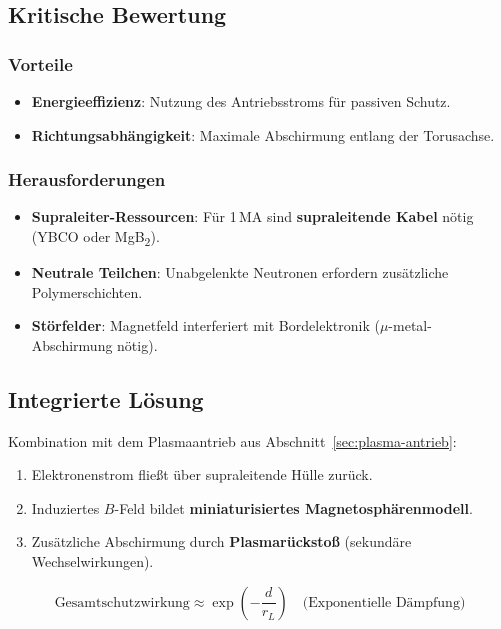 \subsection{Kritische Bewertung}
\subsubsection*{Vorteile}
\begin{itemize}
    \item \textbf{Energieeffizienz}: Nutzung des Antriebsstroms für passiven Schutz.
    \item \textbf{Richtungsabhängigkeit}: Maximale Abschirmung entlang der Torusachse.
\end{itemize}

\subsubsection*{Herausforderungen}
\begin{itemize}
    \item \textbf{Supraleiter-Ressourcen}: Für 1\,MA sind \textbf{supraleitende Kabel} nötig (YBCO oder MgB\textsubscript{2}).
    \item \textbf{Neutrale Teilchen}: Unabgelenkte Neutronen erfordern zusätzliche Polymerschichten.
    \item \textbf{Störfelder}: Magnetfeld interferiert mit Bordelektronik ($\mu$-metal-Abschirmung nötig).
\end{itemize}

\subsection{Integrierte Lösung}
Kombination mit dem Plasmaantrieb aus Abschnitt~\ref{sec:plasma-antrieb}:
\begin{enumerate}
    \item Elektronenstrom fließt über supraleitende Hülle zurück.
    \item Induziertes $B$-Feld bildet \textbf{miniaturisiertes Magnetosphärenmodell}.
    \item Zusätzliche Abschirmung durch \textbf{Plasmarückstoß} (sekundäre Wechselwirkungen).
\end{enumerate}

\begin{equation}
    \text{Gesamtschutzwirkung} \approx \exp\left(-\frac{d}{r_L}\right) \quad \text{(Exponentielle Dämpfung)}
\end{equation}

